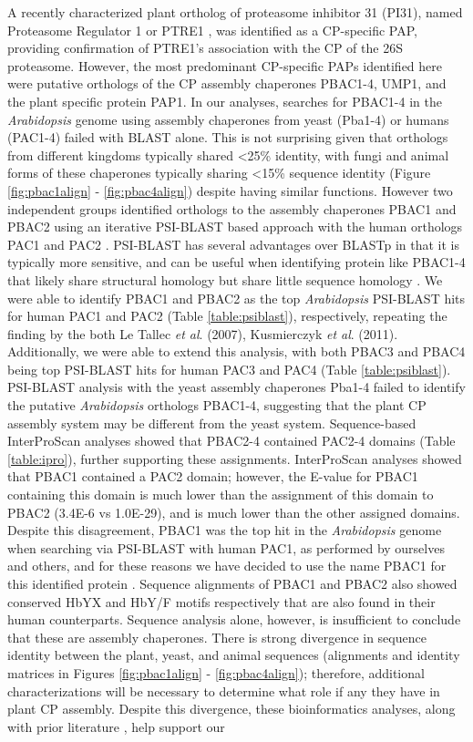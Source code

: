 A recently characterized plant ortholog of proteasome inhibitor 31 (PI31), named Proteasome Regulator 1 or PTRE1 \citep{yang16}, was identified as a CP-specific PAP, providing confirmation of PTRE1's association with the CP of the 26S proteasome. However, the most predominant CP-specific PAPs identified here were putative orthologs of the CP assembly chaperones PBAC1-4, UMP1, and the plant specific protein PAP1. In our analyses, searches for PBAC1-4 in the \textit{Arabidopsis} genome using assembly chaperones from yeast (Pba1-4) or humans (PAC1-4) failed with BLAST alone. This is not surprising given that orthologs from different kingdoms typically shared <25\% identity, with fungi and animal forms of these chaperones typically sharing <15\% sequence identity (Figure \ref{fig:pbac1align} - \ref{fig:pbac4align}) despite having similar functions. However two independent groups identified orthologs to the assembly chaperones PBAC1 and PBAC2 using an iterative PSI-BLAST based approach with the human orthologs PAC1 and PAC2 \citep{kusmierczyk11, le07}. PSI-BLAST has several advantages over BLASTp in that it is typically more sensitive, and can be useful when identifying protein like PBAC1-4 that likely share structural homology but share little sequence homology \citep{altschul97, aravind99, kusmierczyk11, yashiroda08}. We were able to identify PBAC1 and PBAC2 as the top \textit{Arabidopsis} PSI-BLAST hits for human PAC1 and PAC2 (Table \ref{table:psiblast}), respectively, repeating the finding by the both Le Tallec \textit{et al}. (2007), Kusmierczyk \textit{et al}. (2011). Additionally, we were able to extend this analysis, with both PBAC3 and PBAC4 being top PSI-BLAST hits for human PAC3 and PAC4 (Table \ref{table:psiblast}). PSI-BLAST analysis with the yeast assembly chaperones Pba1-4 failed to identify the putative \textit{Arabidopsis} orthologs PBAC1-4, suggesting that the plant CP assembly system may be different from the yeast system. Sequence-based InterProScan analyses showed that PBAC2-4 contained PAC2-4 domains (Table \ref{table:ipro}), further supporting these assignments. InterProScan analyses showed that PBAC1 contained a PAC2 domain; however, the E-value for PBAC1 containing this domain is much lower than the assignment of this domain to PBAC2 (3.4E-6 vs 1.0E-29), and is much lower than the other assigned domains. Despite this disagreement, PBAC1 was the top hit in the \textit{Arabidopsis} genome when searching via PSI-BLAST with human PAC1, as performed by ourselves and others, and for these reasons we have decided to use the name PBAC1 for this identified protein \citep{kusmierczyk11, le07}. Sequence alignments of PBAC1 and PBAC2 also showed conserved HbYX and HbY/F motifs respectively that are also found in their human counterparts. Sequence analysis alone, however, is insufficient to conclude that these are assembly chaperones. There is strong divergence in sequence identity between the plant, yeast, and animal sequences (alignments and identity matrices in Figures \ref{fig:pbac1align} - \ref{fig:pbac4align}); therefore, additional characterizations will be necessary to determine what role if any they have in plant CP assembly. Despite this divergence, these bioinformatics analyses, along with prior literature \citep{kusmierczyk11, le07}, help support our 